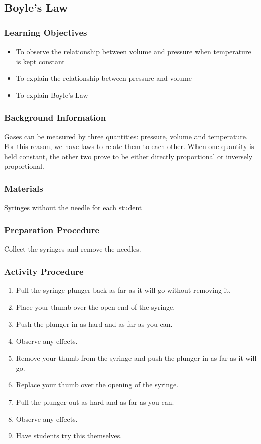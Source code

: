 
\subsection{Boyle's Law}

\subsubsection*{Learning Objectives}
\begin{itemize}
\item{To observe the relationship between volume and pressure when temperature is kept constant} 
\item{To explain the relationship between pressure and volume} 
\item{To explain Boyle's Law} 
\end{itemize}

\subsubsection*{Background Information}
Gases can be measured by three quantities: pressure, volume and temperature. For this reason, we have laws to relate them to each other. When one quantity is held constant, the other two prove to be either directly proportional or inversely proportional.  

\subsubsection*{Materials}
Syringes without the needle for each student

\subsubsection*{Preparation Procedure}
Collect the syringes and remove the needles.

\subsubsection*{Activity Procedure}
\begin{enumerate}
\item{Pull the syringe plunger back as far as it will go without removing it.} 
\item{Place your thumb over the open end of the syringe.} 
\item{Push the plunger in as hard and as far as you can.} 
\item{Observe any effects.} 
\item{Remove your thumb from the syringe and push the plunger in as far as it will go.} 
\item{Replace your thumb over the opening of the syringe.} 
\item{Pull the plunger out as hard and as far as you can.} 
\item{Observe any effects.} 
\item{Have students try this themselves.} 
\end{enumerate}

